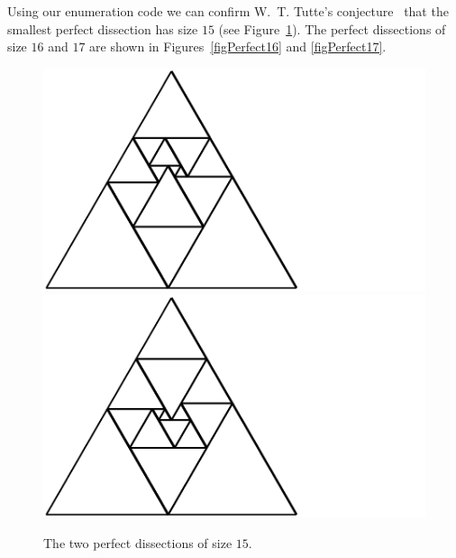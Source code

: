 \documentclass[12pt,amstags,fleqn]{article}
\theoremstyle{plain}
\theoremstyle{definition}
\begin{document}

Using our enumeration code we can confirm W.~T. Tutte's
conjecture~\cite{MR0003040,MR0027521}
that the smallest perfect dissection has size $15$ (see
Figure~\ref{figPerfect15}).
The perfect dissections of size $16$ and $17$ are shown in
Figures~\ref{figPerfect16} and \ref{figPerfect17}.
%
\begin{figure}[htbp]
\begin{center}
\includegraphics{output-dissections-perfect-dissection15_i442079_r7_c4.pdf}\includegraphics{output-dissections-perfect-dissection15_i442079_r7_c6.pdf}
\end{center}
\caption{The two perfect dissections of size $15$.}
\label{figPerfect15}
\end{figure}
%
\end{document}

